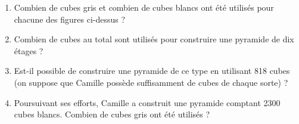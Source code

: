 \documentclass[a4paper]{book}
\begin{document}
{\begin{exercice}
        \begin{enumerate}[label=\arabic*.]
            \item Combien de cubes gris et combien de cubes blancs ont été utilisés pour chacune des figures ci-dessus ?
            \item Combien de cubes au total sont utilisés pour construire une pyramide de dix étages ?
            \item Est-il possible de construire une pyramide de ce type en utilisant 818 cubes (on suppose que Camille possède suffisamment de cubes de chaque sorte) ?
            \item Poursuivant ses efforts, Camille a construit une pyramide comptant 2300 cubes blancs. Combien de cubes gris ont été utilisés ?
        \end{enumerate}
    \end{exercice}  

}
\end{document}
